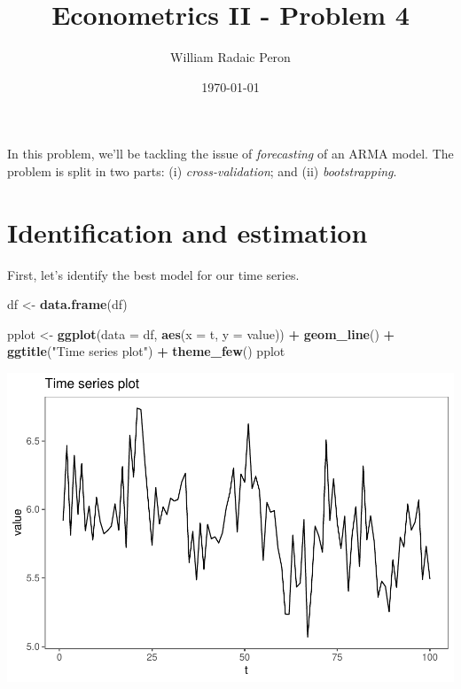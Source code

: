 \documentclass[]{article}
\title{Econometrics II - Problem 4}
\author{William Radaic Peron}
\date{\today}
\newenvironment{Shaded}{\begin{snugshade}}{\end{snugshade}}
\newcommand{\DataTypeTok}[1]{\textcolor[rgb]{0.13,0.29,0.53}{#1}}
\newcommand{\DecValTok}[1]{\textcolor[rgb]{0.00,0.00,0.81}{#1}}
\newcommand{\KeywordTok}[1]{\textcolor[rgb]{0.13,0.29,0.53}{\textbf{#1}}}
\newcommand{\NormalTok}[1]{#1}
\newcommand{\OperatorTok}[1]{\textcolor[rgb]{0.81,0.36,0.00}{\textbf{#1}}}
\newcommand{\StringTok}[1]{\textcolor[rgb]{0.31,0.60,0.02}{#1}}
\begin{document}
\maketitle

In this problem, we'll be tackling the issue of \emph{forecasting} of an
ARMA model. The problem is split in two parts: (i)
\emph{cross-validation}; and (ii) \emph{bootstrapping}.

\section{Identification and estimation}

First, let's identify the best model for our time series.

\begin{Shaded}
\begin{Highlighting}[]
\NormalTok{df <-}\StringTok{ }\KeywordTok{data.frame}\NormalTok{(df)}

\NormalTok{pplot <-}\StringTok{ }\KeywordTok{ggplot}\NormalTok{(}\DataTypeTok{data =}\NormalTok{ df, }\KeywordTok{aes}\NormalTok{(}\DataTypeTok{x =}\NormalTok{ t, }\DataTypeTok{y =}\NormalTok{ value)) }\OperatorTok{+}\StringTok{ }\KeywordTok{geom_line}\NormalTok{() }\OperatorTok{+}\StringTok{ }\KeywordTok{ggtitle}\NormalTok{(}\StringTok{"Time series plot"}\NormalTok{) }\OperatorTok{+}\StringTok{ }\KeywordTok{theme_few}\NormalTok{()}
\NormalTok{pplot }
\end{Highlighting}
\end{Shaded}

\includegraphics{Econo2_P4_files/figure-latex/plots-1.pdf}

\begin{Shaded}
\end{Shaded}
\end{document}
